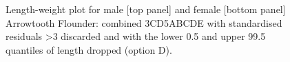 \begin{figure}[htp]
\captionsetup[subfigure]{labelformat=empty}
\begin{center}
\newline
{}
\end{center}
\caption{Length-weight plot for male [top panel] and female [bottom panel] Arrowtooth Flounder: combined 3CD5ABCDE with standardised residuals \textgreater 3 discarded and with the lower 0.5 and upper 99.5 quantiles of length dropped (option D).}
\label{fig:lwOptionD}
\end{figure}

